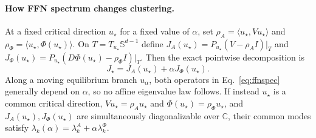 \documentclass[11pt]{article}
\newcommand{\Sph}{\mathbb{S}}
\begin{document}
\paragraph{How FFN spectrum changes clustering.}
At a fixed critical direction $u_\star$ for a fixed value of $\alpha$, set
$\rho_A=\langle u_\star,Vu_\star\rangle$ and
$\rho_\Phi=\langle u_\star,\Phi(u_\star)\rangle$. On
$T=T_{u_\star}\Sph^{d-1}$ define
$J_A(u_\star)=P_{u_\star}(V-\rho_A I)|_T$ and
$J_\Phi(u_\star)=P_{u_\star}(D\Phi(u_\star)-\rho_\Phi I)|_T$. Then the exact
pointwise decomposition is
\begin{equation}
J_\star=J_A(u_\star)+\alpha J_\Phi(u_\star).
\label{eq:ffnspec}
\end{equation}
Along a moving equilibrium branch $u_\alpha$, both operators in
Eq.~\eqref{eq:ffnspec} generally depend on $\alpha$, so no affine eigenvalue law
follows. If instead $u_\star$ is a common critical direction,
$Vu_\star=\rho_Au_\star$ and $\Phi(u_\star)=\rho_\Phi u_\star$, and
$J_A(u_\star),J_\Phi(u_\star)$ are simultaneously diagonalizable over
$\mathbb C$, their common modes satisfy
$\lambda_k(\alpha)=\lambda_k^A+\alpha\lambda_k^\Phi$.
\end{document}
